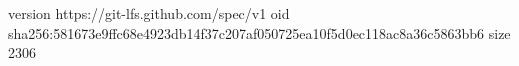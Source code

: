 version https://git-lfs.github.com/spec/v1
oid sha256:581673e9ffc68e4923db14f37c207af050725ea10f5d0ec118ac8a36c5863bb6
size 2306
